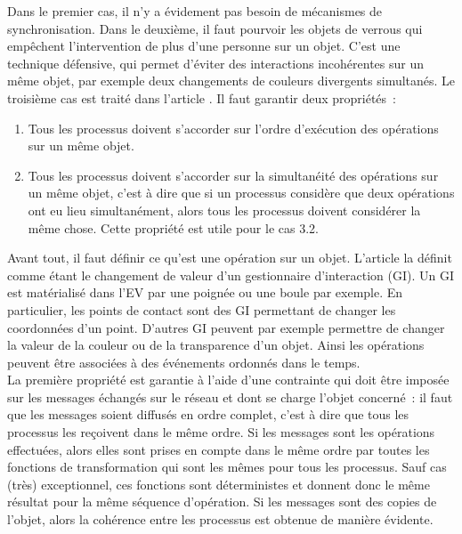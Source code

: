 \documentclass[11pt]{article}
\begin{document}
Dans le premier cas, il n'y a évidement pas besoin de mécanismes de synchronisation. Dans le deuxième, il faut pourvoir les objets de verrous qui empêchent l'intervention de plus d'une personne sur un objet. C'est une technique défensive, qui permet d'éviter des interactions incohérentes sur un même objet, par exemple deux changements de couleurs divergents simultanés. Le troisième cas est traité dans l'article \cite{margery}. Il faut garantir deux propriétés~:
\begin{enumerate}
	\item Tous les processus doivent s'accorder sur l'ordre d'exécution des opérations sur un même objet.
	\item Tous les processus doivent s'accorder sur la simultanéité des opérations sur un même objet, c'est à dire que si un processus considère que deux opérations ont eu lieu simultanément, alors tous les processus doivent considérer la même chose. Cette propriété est utile pour le cas 3.2.
\end{enumerate}

Avant tout, il faut définir ce qu'est une opération sur un objet. L'article \cite{margery} la définit comme étant le changement de valeur d'un gestionnaire d'interaction (GI). Un GI est matérialisé dans l'EV par une poignée ou une boule par exemple. En particulier, les points de contact sont des GI permettant de changer les coordonnées d'un point. D'autres GI peuvent par exemple permettre de changer la valeur de la couleur ou de la transparence d'un objet. Ainsi les opérations peuvent être associées à des événements ordonnés dans le temps.
\\

La première propriété est garantie à l'aide d'une contrainte qui doit être imposée sur les messages échangés sur le réseau et dont se charge l'objet concerné~: il faut que les messages soient diffusés en ordre complet, c'est à dire que tous les processus les reçoivent dans le même ordre. Si les messages sont les opérations effectuées, alors elles sont prises en compte dans le même ordre par toutes les fonctions de transformation qui sont les mêmes pour tous les processus. Sauf cas (très) exceptionnel, ces fonctions sont déterministes et donnent donc le même résultat pour la même séquence d'opération. Si les messages sont des copies de l'objet, alors la cohérence entre les processus est obtenue de manière évidente.
\\
\end{document}
